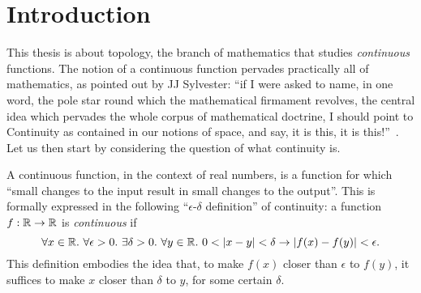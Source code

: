 \chapter{Introduction}\label{chap:intro}

This thesis is about topology, the branch of mathematics that studies \emph{continuous}
functions. The notion of a continuous function pervades practically all of mathematics, as
pointed out by JJ Sylvester: ``if I were asked to name, in one word, the pole star round
which the mathematical firmament revolves, the central idea which pervades the whole
corpus of mathematical doctrine, I should point to Continuity as contained in our notions
of space, and say, it is this, it is this!''~\cite[pg. 27]{armstrong-topology}. Let us
then start by considering the question of what continuity is.

A continuous function, in the context of real numbers, is a function for which
``small changes to the input result in small changes to the output''. This is
formally expressed in the following ``$\epsilon$-$\delta$ definition'' of continuity: a
function $f : \mathbb{R}{} \rightarrow \mathbb{R}{}$ is
\emph{continuous} if
\begin{equation*}\label{eq:cont-0}
  \forall x \in \mathbb{R}{}.~ \forall \epsilon > 0.~ \exists \delta > 0.~ \forall y \in \mathbb{R}{}.~
    0 < | x - y | < \delta \rightarrow | f(x) - f(y) | < \epsilon.
\end{equation*}
This definition embodies the idea that, to make $f(x)$ closer than $\epsilon$ to
$f(y)$, it suffices to make $x$ closer than $\delta$ to $y$, for some certain $\delta$.

